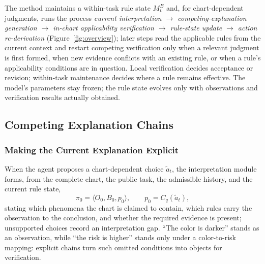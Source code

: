 The method maintains a within-task rule state $M_t^B$
and, for chart-dependent judgments, runs the process
\emph{current interpretation $\rightarrow$
competing-explanation generation $\rightarrow$ in-chart
applicability verification $\rightarrow$ rule-state
update $\rightarrow$ action re-derivation} (Figure~\ref{fig:overview}); later
steps
read the applicable rules from the current context and
restart competing verification only when a relevant
judgment is first formed, when new evidence conflicts
with an existing rule, or when a rule's applicability
conditions are in question.
Local verification decides acceptance or revision;
within-task maintenance decides where a rule remains
effective.
The model's parameters stay frozen; the rule state
evolves only with observations and verification results
actually obtained.

\subsection{Competing Explanation Chains}
\label{sec:method:chains}

\subsubsection{Making the Current Explanation
Explicit}
When the agent proposes a chart-dependent choice
$\widetilde{a}_t$, the interpretation module forms, from
the complete chart, the public task, the admissible
history, and the current rule state,
\begin{equation}\label{eq:pi0}
\pi_0 = \langle O_0, B_0, p_0\rangle,
\qquad
p_0 = C_q(\widetilde{a}_t),
\end{equation}
stating which phenomena the chart is claimed to
contain, which rules carry the observation to the
conclusion, and whether the required evidence is
present; unsupported choices record an interpretation
gap.
``The color is darker'' stands as an observation, while
``the risk is higher'' stands only under a color-to-risk
mapping: explicit chains turn such omitted conditions
into objects for verification.

